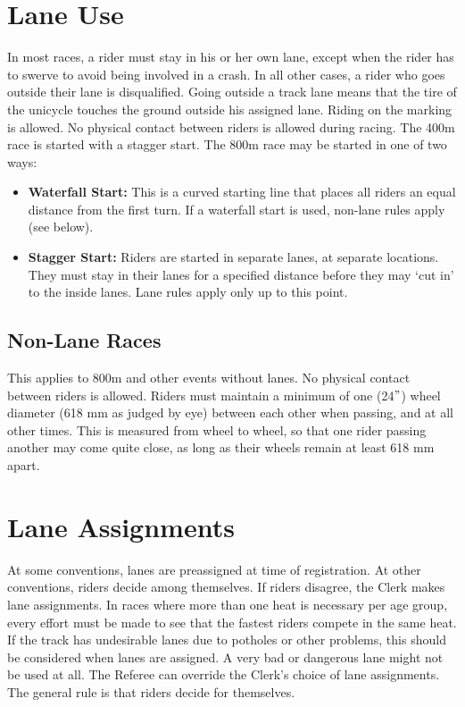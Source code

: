 \section{Lane Use}
In most races, a rider must stay in his or her own lane, except when the rider has to swerve to avoid being involved in a crash.
In all other cases, a rider who goes outside their lane is disqualified.
Going outside a track lane means that the tire of the unicycle touches the ground outside his assigned lane.
Riding on the marking is allowed.
No physical contact between riders is allowed during racing.
The 400m race is started with a stagger start.
The 800m race may be started in one of two ways:
\begin{itemize}
\item \textbf{Waterfall Start:} This is a curved starting line that places all riders an equal distance from the first turn.
If a waterfall start is used, non-lane rules apply (see below).
\item \textbf{Stagger Start:} Riders are started in separate lanes, at separate locations.
They must stay in their lanes for a specified distance before they may `cut in' to the inside lanes.
Lane rules apply only up to this point.
\end{itemize}

\subsection{Non-Lane Races \label{subsec:track-field_lane-use_non-lane-races}}
This applies to 800m and other events without lanes.
No physical contact between riders is allowed.
Riders must maintain a minimum of one (24$"$) wheel diameter (618 mm as judged by eye) between each other when passing, and at all other times.
This is measured from wheel to wheel, so that one rider passing another may come quite close, as long as their wheels remain at least 618 mm apart.

\section{Lane Assignments}
At some conventions, lanes are preassigned at time of registration.
At other conventions, riders decide among themselves.
If riders disagree, the Clerk makes lane assignments.
In races where more than one heat is necessary per age group, every effort must be made to see that the fastest riders compete in the same heat.
If the track has undesirable lanes due to potholes or other problems, this should be considered when lanes are assigned.
A very bad or dangerous lane might not be used at all.
The Referee can override the Clerk's choice of lane assignments.
The general rule is that riders decide for themselves.

